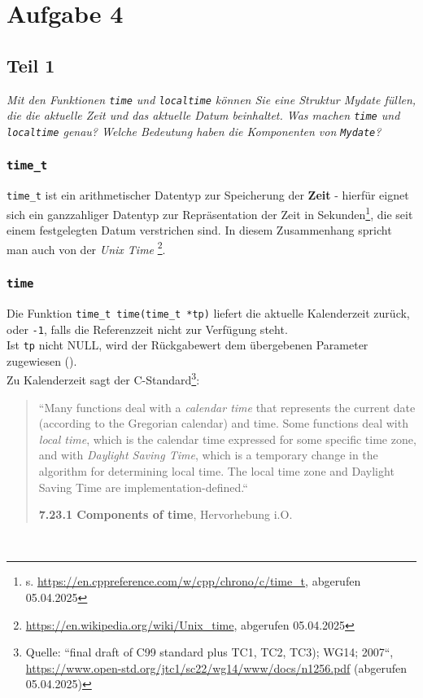 \chapter{Aufgabe 4}


\section{Teil 1}

\textit{Mit den Funktionen \texttt{time} und \texttt{localtime} können Sie eine Struktur
Mydate füllen, die die aktuelle Zeit und das aktuelle Datum beinhaltet.
Was machen \texttt{time} und \texttt{localtime} genau? Welche Bedeutung haben die
Komponenten von \texttt{Mydate}?}\\

\subsection*{\texttt{time\_t}}
\texttt{time\_t} ist ein arithmetischer Datentyp zur Speicherung der \textbf{Zeit} - hierfür eignet sich ein ganzzahliger Datentyp zur Repräsentation der Zeit in Sekunden\footnote{
s. \url{https://en.cppreference.com/w/cpp/chrono/c/time_t}, abgerufen 05.04.2025
}, die seit einem festgelegten Datum verstrichen sind.
In diesem Zusammenhang spricht man auch von der \textit{Unix Time} \footnote{
\url{https://en.wikipedia.org/wiki/Unix_time}, abgerufen 05.04.2025
}.

\subsection*{\texttt{time}}
Die Funktion \texttt{time\_t time(time\_t *tp)} liefert die aktuelle Kalenderzeit zurück, oder \texttt{-1}, falls die Referenzzeit nicht zur Verfügung steht.\\
Ist \texttt{tp} nicht NULL, wird der Rückgabewert dem übergebenen Parameter zugewiesen (\cite[256]{KR88}).\\

Zu Kalenderzeit sagt der C-Standard\footnote{
    Quelle: ``final draft of C99 standard plus TC1, TC2, TC3); WG14; 2007``, \url{https://www.open-std.org/jtc1/sc22/wg14/www/docs/n1256.pdf} (abgerufen 05.04.2025)
}:

\blockquote[{\textbf{7.23.1 Components of time}, Hervorhebung i.O.}]{
``Many functions deal with a \textit{calendar time} that represents the current
date (according to the Gregorian calendar) and time. Some functions deal with \textit{local
    time}, which is the calendar time expressed for some specific time zone, and with \textit{Daylight
    Saving Time}, which is a temporary change in the algorithm for determining local time.
    The local time zone and Daylight Saving Time are implementation-defined.``
}\\

